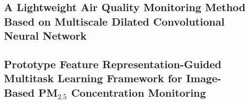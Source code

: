 \documentclass[conference]{IEEEtran}
\newcommand{\pmtwofive}{PM$_{2.5}$}
\begin{document}
\subsection{
  A Lightweight Air Quality Monitoring Method Based on Multiscale Dilated
  Convolutional Neural Network
}

\subsection{
  Prototype Feature Representation-Guided Multitask Learning Framework for
  Image-Based \pmtwofive{} Concentration Monitoring
}


\end{document}
